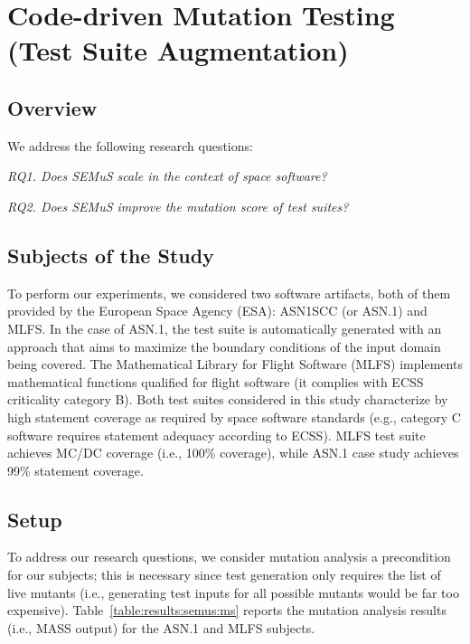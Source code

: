 \clearpage
\section{Code-driven Mutation Testing (Test Suite Augmentation)}
\label{sec:testGeneration:codeDriven}

\subsection{Overview}

We address the following research questions:

\emph{RQ1. Does SEMuS scale in the context of space software?}

\emph{RQ2. Does SEMuS improve the mutation score of test suites?}

\subsection{Subjects of the Study}

To perform our experiments, we considered two software artifacts, both of them provided by the European Space Agency (ESA): ASN1SCC (or ASN.1) and MLFS.
In the case of ASN.1, the test suite is automatically generated with an approach that aims to maximize the boundary conditions of the input domain being covered. 
The Mathematical Library for Flight Software (MLFS) implements mathematical functions qualified for flight software (it complies with ECSS criticality category B).
Both test suites considered in this study characterize by high statement coverage as required by space software standards (e.g., category C software requires statement adequacy according to ECSS). MLFS test suite achieves MC/DC coverage (i.e., 100\% coverage), while ASN.1 case study achieves 99\% statement coverage.


\subsection{Setup}

To address our research questions, we consider mutation analysis a precondition for our subjects; this is necessary since test generation only requires the list of live mutants (i.e., generating test inputs for all possible mutants would be far too expensive). Table~\ref{table:results:semus:ms} reports the mutation analysis results (i.e., MASS output) for the ASN.1 and MLFS subjects.

